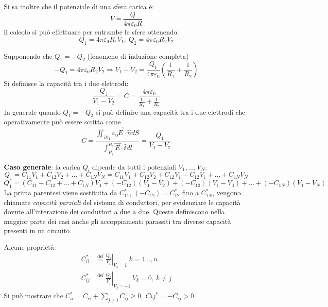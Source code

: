 Si sa inoltre che il potenziale di una sfera carica è:
$$
V = \frac{Q}{4 \pi \varepsilon_0 R}
$$
il calcolo si può effettuare per entrambe le sfere ottenendo:
$$
Q_1 = 4 \pi \varepsilon_0 R_1 V_1,\ Q_2 = 4 \pi \varepsilon_0 R_2 V_2
$$

Supponendo che $Q_1 = -Q_2$ (fenomeno di induzione completa)
$$
-Q_1 = 4 \pi \varepsilon_0 R_2 V_2 \Rightarrow V_1 - V_2 = \frac{Q_1}{4 \pi \varepsilon_0}
\left(\frac{1}{R_1} + \frac{1}{R_2}\right)
$$
Si definisce la capacità tra i due elettrodi:
$$
\frac{Q_1}{V_1 - V_2} = C = \frac{4 \pi \varepsilon_0}{\frac{1}{R_1}+\frac{1}{R_2}}
$$
In generale quando $Q_1 = - Q_2$ si può definire una capacità tra i due elettrodi che operativamente
può essere scritta come 
$$
C = \frac{\iint_{\partial c_1} \varepsilon_0 \vec{E}\cdot\hat{n}dS} {\int_{P_1}^{P_2}\vec{E}\cdot\hat{t} dl} = \frac{Q_1}{V_1 - V_2}
$$


\textbf{Caso generale}: la carica $Q_i$ dipende da tutti i potenziali $V_1, \ldots ,V_N$:
$$
Q_1 = C_{11}V_1 + C_{12}V_2 + \ldots + C_{1N}V_N = C_{11}V_1 + C_{12}V_2 + C_{12}V_1 - C_{12} V_1 +
\ldots  + C_{1N}V_N
$$
$$
Q_1 = \left(C_{11}+C_{12} + \ldots + C_{1N}\right) V_1 + (-C_{12})(V_1-V_2) + (-C_{13})(V_1-V_3)
+ \ldots + (-C_{1N})(V_1-V_N)
$$
La prima parentesi viene sostituita da $C_{11}^*$, $(-C_{12}) = C_{12}^*$ fino a $C_{1N}^*$,
vengono chiamate
\textit{capacità parziali} del sistema di conduttori, per evidenziare le capacità 
dovute all'interazione dei conduttori a due a due.
Queste definiscono nella maggior parte dei casi anche gli accoppiamenti parassiti
tra diverse capacità presenti in un circuito.

Alcune proprietà:
$$\begin{aligned}
C_{ii}^* &\stackrel{\text{def}}{=} \left.\frac{Q_i}{V_i}\right|_{V_k = 1}\ k=1\ldots ,n\\
C_{ij}^* &\stackrel{\text{def}}{=} \left.\frac{Q_i}{V_j}\right|_{V_j=-1}\ V_k = 0,\ k \neq j
\end{aligned}
$$
Si può mostrare che $C_{ii}^* =C_{ii} + \sum_{j\neq i}C_{ij} \geq 0,\ C{ij}^* = -C_{ij} > 0$

